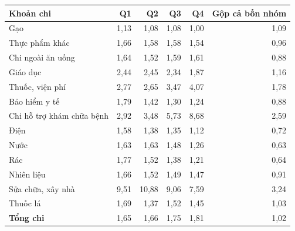 \begin{tabular}{lrrrrr}
\toprule
Khoản chi & Q1 & Q2 & Q3 & Q4 & Gộp cả bốn nhóm \\
\midrule
Gạo & 1,13 & 1,08 & 1,08 & 1,00 & 1,09 \\
Thực phẩm khác & 1,66 & 1,58 & 1,58 & 1,54 & 0,96 \\
Chi ngoài ăn uống & 1,64 & 1,52 & 1,59 & 1,61 & 0,88 \\
Giáo dục & 2,44 & 2,45 & 2,34 & 1,87 & 1,16 \\
Thuốc, viện phí & 2,77 & 2,65 & 3,47 & 4,07 & 1,78 \\
Bảo hiểm y tế & 1,79 & 1,42 & 1,30 & 1,24 & 0,88 \\
Chi hỗ trợ khám chữa bệnh & 2,92 & 3,48 & 5,73 & 8,68 & 2,59 \\
Điện & 1,58 & 1,38 & 1,35 & 1,12 & 0,72 \\
Nước & 1,63 & 1,63 & 1,48 & 1,26 & 0,63 \\
Rác & 1,77 & 1,52 & 1,38 & 1,21 & 0,64 \\
Nhiên liệu & 1,66 & 1,52 & 1,49 & 1,47 & 0,91 \\
Sửa chữa, xây nhà & 9,51 & 10,88 & 9,06 & 7,59 & 3,24 \\
Thuốc lá & 1,69 & 1,37 & 1,52 & 1,45 & 1,03 \\
\textbf{Tổng chi} & 1,65 & 1,66 & 1,75 & 1,81 & 1,02 \\
\bottomrule
\end{tabular}

